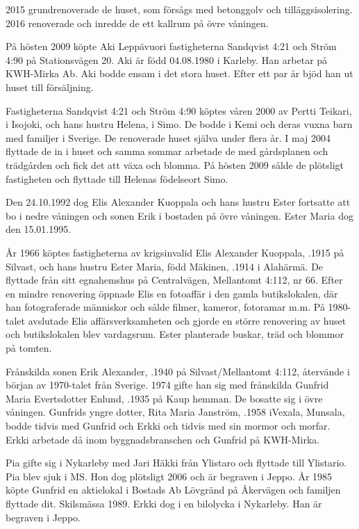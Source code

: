 2015 grundrenoverade de huset, som försågs med betonggolv och tilläggsisolering. 2016 renoverade och inredde de ett kallrum på övre våningen.


På hösten 2009 köpte Aki Leppävuori fastigheterna Sandqvist 4:21 och Ström 4:90 på Stationsvägen 20. Aki är född 04.08.1980 i Karleby. Han arbetar på KWH-Mirka Ab. Aki bodde ensam i det stora huset. Efter	ett par år bjöd han ut huset till försäljning.


Fastigheterna Sandqvist 4:21 och Ström 4:90 köptes våren 2000 av	Pertti Teikari,  i Isojoki, och hans hustru Helena,  i Simo. De bodde i Kemi och deras vuxna barn med familjer i Sverige. De renoverade huset själva under flera år. I maj 2004 flyttade de in i huset och samma sommar arbetade de med gårdsplanen och	trädgården och fick det att växa och blomma. På hösten 2009 sålde de	plötsligt fastigheten och flyttade till Helenas födelseort Simo.


Den 24.10.1992 dog Elis Alexander Kuoppala och hans hustru Ester fortsatte att bo i nedre våningen och sonen Erik i bostaden på övre våningen. Ester Maria dog den 15.01.1995.


År 1966 köptes fastigheterna av krigsinvalid Elis Alexander Kuoppala,	.1915 på Silvast, och hans hustru Ester Maria, född Mäkinen, .1914 i	Alahärmä.  De flyttade från sitt egnahemshus på Centralvägen, Mellantomt 4:112, nr 66. Efter en mindre renovering öppnade Elis en fotoaffär i den gamla butikslokalen, där han 	fotograferade människor och sålde filmer, kameror, fotoramar m.m. På 1980-talet avslutade Elis affärsverksamheten och gjorde en större renovering av huset och butikslokalen blev vardagsrum. Ester planterade buskar, träd och blommor på tomten.

Frånskilda sonen Erik Alexander, .1940 på Silvast/Mellantomt 4:112, återvände i början av 1970-talet från Sverige. 1974 gifte han sig med frånskilda Gunfrid Maria Evertsdotter Enlund, .1935 på Kaup hemman. De bosatte sig i övre våningen. Gunfrids yngre dotter, Rita Maria Janström, .1958 iVexala, Munsala, bodde tidvis med Gunfrid och Erkki och tidvis med sin mormor och morfar. Erkki arbetade då 	inom byggnadsbranschen och Gunfrid på KWH-Mirka.
\begin{jhchildren}
  \item {}
\end{jhchildren}
Pia gifte sig i Nykarleby med Jari Häkki från Ylistaro och flyttade till Ylistario. Pia blev sjuk i MS. Hon dog plötsligt 2006 och är begraven i Jeppo. År 1985 köpte Gunfrid en aktielokal i Bostads Ab Lövgränd på Åkervägen och familjen flyttade dit. Skilsmässa 1989. Erkki dog i en bilolycka i Nykarleby. Han är begraven i Jeppo.


